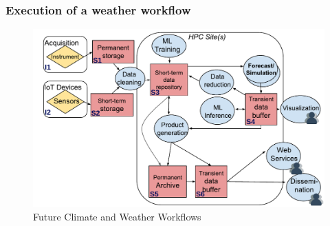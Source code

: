 \documentclass[a4paper, twocolumn]{article}
\begin{document}
\subsubsection{Execution of a weather workflow}



\begin{figure}[b]
  \includegraphics[width=\columnwidth]{climateweather-workflow}
  \caption{Future Climate and Weather Workflows}
  \label{fig:climateWeather}
\end{figure}
\end{document}
